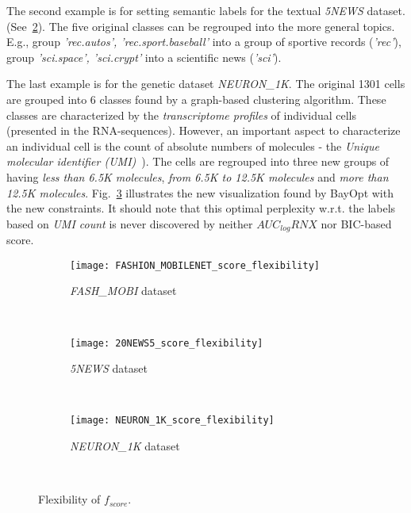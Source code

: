 The second example is for setting semantic labels for the textual \emph{5NEWS} dataset. (See~\ref{fig:flexibility:5NEWS}).
The five original classes can be regrouped into the more general topics.
E.g., group \emph{'rec.autos', 'rec.sport.baseball'} into a group of sportive records (\emph{'rec'}), group \emph{'sci.space', 'sci.crypt'} into a scientific news (\emph{'sci'}).

The last example is for the genetic dataset \emph{NEURON\_1K}.
The original 1301 cells are grouped into 6 classes found by a graph-based clustering algorithm.
These classes are characterized by the \emph{transcriptome profiles} of individual cells (presented in the RNA-sequences).
However, an important aspect to characterize an individual cell is the count of absolute numbers of molecules - the \emph{Unique molecular identifier (UMI)}~\cite{kivioja2011counting}).
The cells are regrouped into three new groups of having \emph{less than 6.5K molecules}, \emph{from 6.5K to 12.5K molecules} and \emph{more than 12.5K molecules}.
Fig.~\ref{fig:flexibility:NEURON1K} illustrates the new visualization found by BayOpt with the new constraints.
It should note that this optimal perplexity w.r.t. the labels based on \emph{UMI count} is never discovered by neither $AUC_{log}RNX$ nor BIC-based score.

\begin{figure*}[ht!]
    \centering
    \begin{subfigure}[b]{.32\linewidth}
        \texttt{[image: FASHION\_MOBILENET\_score\_flexibility]}
        \caption{\emph{FASH\_MOBI} dataset}
        \label{fig:flexibility:FASHMOBI}
    \end{subfigure}
    ~
    \begin{subfigure}[b]{.32\linewidth}
        \texttt{[image: 20NEWS5\_score\_flexibility]}
        \caption{\emph{5NEWS} dataset}
        \label{fig:flexibility:5NEWS}
    \end{subfigure}
    ~
    \begin{subfigure}[b]{.32\linewidth}
        \texttt{[image: NEURON\_1K\_score\_flexibility]}
        \caption{\emph{NEURON\_1K} dataset}
        \label{fig:flexibility:NEURON1K}
    \end{subfigure}
    ~
    \caption{Flexibility of $f_{score}$.}
    \label{fig:flexibility}
\end{figure*}


